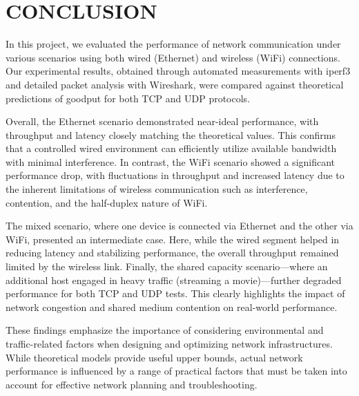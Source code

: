 
\section{CONCLUSION} \label{sec:conclusion}

    In this project, we evaluated the performance of network communication under various scenarios using both wired (Ethernet) and wireless (WiFi) connections. 
    Our experimental results, obtained through automated measurements with iperf3 and detailed packet analysis with Wireshark, were compared against theoretical predictions of goodput for both TCP and UDP protocols.

    Overall, the Ethernet scenario demonstrated near-ideal performance, with throughput and latency closely matching the theoretical values. 
    This confirms that a controlled wired environment can efficiently utilize available bandwidth with minimal interference. 
    In contrast, the WiFi scenario showed a significant performance drop, with fluctuations in throughput and increased latency due to the inherent limitations of wireless communication such as interference, contention, and the half-duplex nature of WiFi.

    The mixed scenario, where one device is connected via Ethernet and the other via WiFi, presented an intermediate case. 
    Here, while the wired segment helped in reducing latency and stabilizing performance, the overall throughput remained limited by the wireless link. 
    Finally, the shared capacity scenario—where an additional host engaged in heavy traffic (streaming a movie)—further degraded performance for both TCP and UDP tests. 
    This clearly highlights the impact of network congestion and shared medium contention on real-world performance.

    These findings emphasize the importance of considering environmental and traffic-related factors when designing and optimizing network infrastructures. 
    While theoretical models provide useful upper bounds, actual network performance is influenced by a range of practical factors that must be taken into account for effective network planning and troubleshooting.
